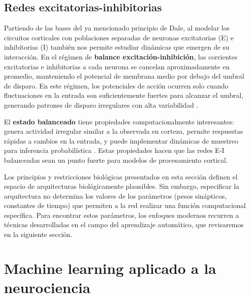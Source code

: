 \subsection{Redes excitatorias-inhibitorias}
\label{subsec:redes_ei}

Partiendo de las bases del ya mencionado principio de Dale, al modelar los circuitos corticales con poblaciones separadas de neuronas excitatorias (E) e inhibitorias (I) también nos permite estudiar dinámicas que emergen de su interacción. En el régimen de \textbf{balance excitación-inhibición}, las corrientes excitatorias e inhibitorias a cada neurona se cancelan aproximadamente en promedio, manteniendo el potencial de membrana medio por debajo del umbral de disparo. En este régimen, los potenciales de acción ocurren solo cuando fluctuaciones en la entrada son suficientemente fuertes para alcanzar el umbral, generando patrones de disparo irregulares con alta variabilidad \citep{dayan2005theoretical}.

El \textbf{estado balanceado} tiene propiedades computacionalmente interesantes: genera actividad irregular similar a la observada en corteza, permite respuestas rápidas a cambios en la entrada, y puede implementar dinámicas de muestreo para inferencia probabilística \citep{echeveste2020cortical}. Estas propiedades hacen que las redes E-I balanceadas sean un punto fuerte para modelos de procesamiento cortical.

\medskip

Los principios y restricciones biológicas presentados en esta sección definen el espacio de arquitecturas biológicamente plausibles. Sin embargo, especificar la arquitectura no determina los valores de los parámetros (pesos sinápticos, constantes de tiempo) que permiten a la red realizar una función computacional específica. Para encontrar estos parámetros, los enfoques modernos recurren a técnicas desarrolladas en el campo del aprendizaje automático, que revisaremos en la siguiente sección.


\section{Machine learning aplicado a la neurociencia}
\label{sec:machine_learning}

